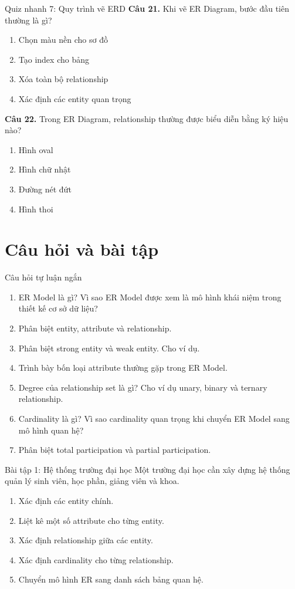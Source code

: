 \documentclass[aspectratio=169,11pt]{beamer}
\newcommand{\tightlist}{\setlength{\itemsep}{2pt}\setlength{\parskip}{0pt}}
\newcommand{\smallitem}{\setlength{\itemsep}{2pt}\setlength{\parskip}{0pt}}
\newcommand{\qoption}[2]{\item[#1.] #2}
\begin{document}
\begin{frame}{Quiz nhanh 7: Quy trình vẽ ERD}
\small
\textbf{Câu 21.} Khi vẽ ER Diagram, bước đầu tiên thường là gì?
\begin{enumerate}
\tightlist
  \qoption{A}{Chọn màu nền cho sơ đồ}
  \qoption{B}{Tạo index cho bảng}
  \qoption{C}{Xóa toàn bộ relationship}
  \qoption{D}{Xác định các entity quan trọng}
\end{enumerate}

\textbf{Câu 22.} Trong ER Diagram, relationship thường được biểu diễn bằng ký hiệu nào?
\begin{enumerate}
\tightlist
  \qoption{A}{Hình oval}
  \qoption{B}{Hình chữ nhật}
  \qoption{C}{Đường nét đứt}
  \qoption{D}{Hình thoi}
\end{enumerate}
\end{frame}

\section{Câu hỏi và bài tập}

\begin{frame}[allowframebreaks]{Câu hỏi tự luận ngắn}
\small
\begin{enumerate}
\smallitem
  \item ER Model là gì? Vì sao ER Model được xem là mô hình khái niệm trong thiết kế cơ sở dữ liệu?
  \item Phân biệt entity, attribute và relationship.
  \item Phân biệt strong entity và weak entity. Cho ví dụ.
  \item Trình bày bốn loại attribute thường gặp trong ER Model.
  \item Degree của relationship set là gì? Cho ví dụ unary, binary và ternary relationship.
  \item Cardinality là gì? Vì sao cardinality quan trọng khi chuyển ER Model sang mô hình quan hệ?
  \item Phân biệt total participation và partial participation.
\end{enumerate}
\end{frame}

\begin{frame}{Bài tập 1: Hệ thống trường đại học}
\small
Một trường đại học cần xây dựng hệ thống quản lý sinh viên, học phần, giảng viên và khoa.

\vspace{2mm}
\begin{enumerate}
\smallitem
  \item Xác định các entity chính.
  \item Liệt kê một số attribute cho từng entity.
  \item Xác định relationship giữa các entity.
  \item Xác định cardinality cho từng relationship.
  \item Chuyển mô hình ER sang danh sách bảng quan hệ.
\end{enumerate}
\end{frame}
\end{document}
